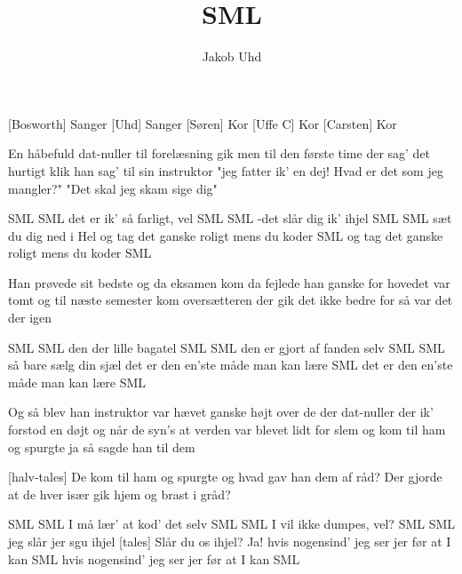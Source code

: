 \documentclass[a4paper,11pt]{article}
\title{SML}
\author{Jakob Uhd}
\begin{document}
\maketitle

\begin{roles}
[Bosworth] Sanger
[Uhd] Sanger
[Søren] Kor
[Uffe C] Kor
[Carsten] Kor
\end{roles}

\begin{props}
\end{props}
\begin{song}

En håbefuld dat-nuller
til forelæsning gik
men til den første time
der sag' det hurtigt klik
han sag' til sin instruktor
"jeg fatter ik' en dej!
Hvad er det som jeg mangler?"
"Det skal jeg skam sige dig"


SML SML
det er ik' så farligt, vel
SML SML
-det slår dig ik' ihjel
SML SML
sæt du dig ned i Hel
og tag det ganske roligt mens du koder SML
og tag det ganske roligt mens du koder SML

Han prøvede sit bedste
og da eksamen kom
da fejlede han ganske
for hovedet var tomt
og til næste semester
kom oversætteren
der gik det ikke bedre
for så var det der igen

SML SML
den der lille bagatel
SML SML
den er gjort af fanden selv
SML SML
så bare sælg din sjæl
det er den en'ste måde man kan lære SML
det er den en'ste måde man kan lære SML

Og så blev han instruktor
var hævet ganske højt
over de der dat-nuller
der ik' forstod en døjt
og når de syn's at verden
var blevet lidt for slem
og kom til ham og spurgte
ja så sagde han til dem

[halv-tales] De kom til ham og spurgte og hvad gav han dem
af råd?
Der gjorde at de hver især gik hjem og brast i gråd?

SML SML
I må lær' at kod' det selv
SML SML
I vil ikke dumpes, vel?
SML SML
jeg slår jer sgu ihjel
[tales] Slår du os ihjel?
 Ja!
 hvis nogensind' jeg ser jer før at I kan SML
hvis nogensind' jeg ser jer før at I kan SML

\end{song}
\end{document}
